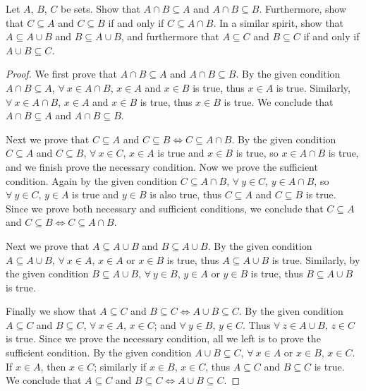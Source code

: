 \begin{exercise}\label{ex 3.1.7}
Let \(A\), \(B\), \(C\) be sets.
Show that \(A \cap B \subseteq A\) and \(A \cap B \subseteq B\).
Furthermore, show that \(C \subseteq A\) and \(C \subseteq B\) if and only if \(C \subseteq A \cap B\).
In a similar spirit, show that \(A \subseteq A \cup B\) and \(B \subseteq A \cup B\), and furthermore that \(A \subseteq C\) and \(B \subseteq C\) if and only if \(A \cup B \subseteq C\).
\end{exercise}

\begin{proof}
We first prove that \(A \cap B \subseteq A\) and \(A \cap B \subseteq B\).
By the given condition \(A \cap B \subseteq A\), \(\forall\ x \in A \cap B\), \(x \in A\) and \(x \in B\) is true, thus \(x \in A\) is true.
Similarly, \(\forall\ x \in A \cap B\), \(x \in A\) and \(x \in B\) is true, thus \(x \in B\) is  true.
We conclude that \(A \cap B \subseteq A\) and \(A \cap B \subseteq B\).

Next we prove that \(C \subseteq A\) and \(C \subseteq B \iff C \subseteq A \cap B\).
By the given condition \(C \subseteq A\) and \(C \subseteq B\), \(\forall\ x \in C\), \(x \in A\) is true and \(x \in B\) is true, so \(x \in A \cap B\) is true, and we finish prove the necessary condition.
Now we prove the sufficient condition.
Again by the given condition \(C \subseteq A \cap B\), \(\forall\ y \in C\), \(y \in A \cap B\), so \(\forall\ y \in C\), \(y \in A\) is true and \(y \in B\) is also true, thus \(C \subseteq A\) and \(C \subseteq B\) is true.
Since we prove both necessary and sufficient conditions, we conclude that \(C \subseteq A\) and \(C \subseteq B \iff C \subseteq A \cap B\).

Next we prove that \(A \subseteq A \cup B\) and \(B \subseteq A \cup B\).
By the given condition \(A \subseteq A \cup B\), \(\forall\ x \in A\), \(x \in A\) or \(x \in B\) is true, thus \(A \subseteq A \cup B\) is true.
Similarly, by the given condition \(B \subseteq A \cup B\), \(\forall\ y \in B\), \(y \in A\) or \(y \in B\) is true, thus \(B \subseteq A \cup B\) is true.

Finally we show that \(A \subseteq C\) and \(B \subseteq C \iff A \cup B \subseteq C\).
By the given condition \(A \subseteq C\) and \(B \subseteq C\), \(\forall\ x \in A\), \(x \in C\); and \(\forall\ y \in B\), \(y \in C\).
Thus \(\forall\ z \in A \cup B\), \(z \in C\) is true.
Since we prove the necessary condition, all we left is to prove the sufficient condition.
By the given condition \(A \cup B \subseteq C\), \(\forall\ x \in A\) or \(x \in B\), \(x \in C\).
If \(x \in A\), then \(x \in C\); similarly if \(x \in B\), \(x \in C\), thus \(A \subseteq C\) and \(B \subseteq C\) is true.
We conclude that \(A \subseteq C\) and \(B \subseteq C \iff A \cup B \subseteq C\).
\end{proof}

